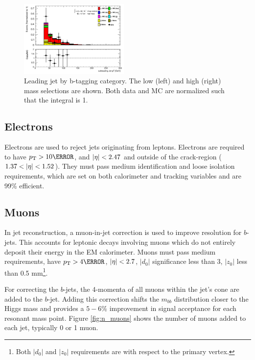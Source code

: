 \begin{figure}[htbp]
  \includegraphics[width=0.48\textwidth]{chapters/chapter5_yybb/images/data_MC_comparison/h_SR_h_2t_nominal_subleadingJet_pt.pdf}
  \caption[Subleading jet \pt.]{Leading jet \pt by b-tagging category. The low (left) and high (right) mass selections are shown. Both data and MC are normalized such that the integral is 1.
  \label{fig:jet_s_pt}}
\end{figure}


\subsection{Electrons}

Electrons are used to reject jets originating from leptons. Electrons are required to have $\pt > \unit{10}{\GeV}$, and $|\eta| < 2.47$ and outside of the crack-region ($1.37 < |\eta| < 1.52$). They must pass medium identification and loose isolation requirements, which are set on both calorimeter and tracking variables and are 99\% efficient.

\subsection{Muons}

In jet reconstruction, a muon-in-jet correction is used to improve resolution for $b$-jets. This accounts for leptonic decays involving muons which do not entirely deposit their energy in the \gls{EM} calorimeter. Muons must pass medium requirements, have $\pt > \unit{4}{\GeV}$, $|\eta| < 2.7$, $|d_{0}|$ significance less than 3, $|z_{0}|$ less than 0.5 mm\footnote{Both $|d_{0}|$ and $|z_{0}|$ requirements are with respect to the primary vertex.}.

For correcting the $b$-jets, the 4-momenta of all muons within the jet's \Dr cone are added to the $b$-jet. Adding this correction shifts the $m_{bb}$ distribution closer to the Higgs mass and provides a $5-6\%$ improvement in signal acceptance for each resonant mass point. Figure \ref{fig:n_muons} shows the number of muons added to each jet, typically 0 or 1 muon.

